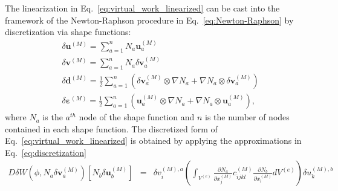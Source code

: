 The linearization in Eq.\ \eqref{eq:virtual_work_linearized} can be cast into the framework of the Newton-Raphson procedure in Eq.\ \eqref{eq:Newton-Raphson} by discretization via shape functions:
%
\begin{align}
&\delta \pmb{u}^{(M)} = \sum_{a=1}^n N_a \pmb{u}_a^{(M)} \nonumber\\
%
&\delta \pmb{v}^{(M)} = \sum_{a=1}^n N_a \delta \pmb{v}_a^{(M)} \nonumber\\
%
&\delta \pmb{d}^{(M)} = \frac{1}{2} \sum_{a=1}^n (\delta \pmb{v}_a^{(M)} \otimes \nabla N_a + \nabla N_a \otimes \delta \pmb{v}_a^{(M)}) \nonumber\\
%
&\delta \pmb{\varepsilon}^{(M)} = \frac{1}{2} \sum_{a=1}^n (\pmb{u}_a^{(M)} \otimes \nabla N_a + \nabla N_a \otimes \pmb{u}_a^{(M)}),
\label{eq:discretization}
\end{align}
%
where $N_a$ is the $a^{th}$ node of the shape function and $n$ is the number of nodes contained in each shape function. The discretized form of Eq.\ \eqref{eq:virtual_work_linearized} is obtained by applying the approximations in Eq.\ \eqref{eq:discretization} 
%
\begin{eqnarray}
D\delta W(\phi,N_a\delta \pmb{v}_a^{(M)})[N_b\delta \pmb{u}_b^{(M)}] &=& \delta v_i^{(M),a}\left(\int_{V^{(e)}}\frac{\partial N_a}{\partial x_j^{(M)}} c_{ijkl}^{(M)} \frac{\partial N_b}{\partial x_l^{(M)}} dV^{(e)} \right) \delta u_k^{(M),b} 
\end{eqnarray}
%

